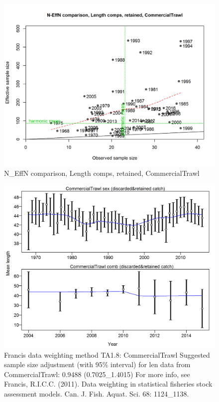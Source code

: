 \documentclass[12pt,]{article}
\begin{document}
\begin{figure}[htbp]
\centering
\includegraphics{./r4ss/plots_mod1/comp_lenfit_sampsize_flt1mkt2.png}
\caption{N\_EffN comparison, Length comps, retained, CommercialTrawl
\label{fig:mod1_4_comp_lenfit_sampsize_flt1mkt2}}
\end{figure}

\begin{figure}[htbp]
\centering
\includegraphics{./r4ss/plots_mod1/comp_lenfit_data_weighting_TA1.8_CommercialTrawl.png}
\caption{Francis data weighting method TA1.8: CommercialTrawl Suggested
sample size adjustment (with 95\% interval) for len data from
CommercialTrawl: 0.9488 (0.7025\_1.4015) For more info, see Francis,
R.I.C.C. (2011). Data weighting in statistical fisheries stock
assessment models. Can. J. Fish. Aquat. Sci. 68: 1124\_1138.
\label{fig:mod1_5_comp_lenfit_data_weighting_TA1.8_CommercialTrawl}}
\end{figure}
\end{document}
